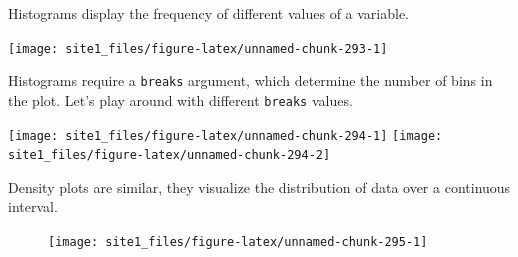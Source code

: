 \documentclass[]{book}
\newenvironment{Shaded}{\begin{snugshade}}{\end{snugshade}}
\newcommand{\KeywordTok}[1]{\textcolor[rgb]{0.13,0.29,0.53}{\textbf{#1}}}
\newcommand{\DataTypeTok}[1]{\textcolor[rgb]{0.13,0.29,0.53}{#1}}
\newcommand{\DecValTok}[1]{\textcolor[rgb]{0.00,0.00,0.81}{#1}}
\newcommand{\StringTok}[1]{\textcolor[rgb]{0.31,0.60,0.02}{#1}}
\newcommand{\CommentTok}[1]{\textcolor[rgb]{0.56,0.35,0.01}{\textit{#1}}}
\newcommand{\OperatorTok}[1]{\textcolor[rgb]{0.81,0.36,0.00}{\textbf{#1}}}
\newcommand{\AlertTok}[1]{\textcolor[rgb]{0.94,0.16,0.16}{#1}}
\newcommand{\NormalTok}[1]{#1}
\begin{document}
Histograms display the frequency of different values of a variable.

\begin{Shaded}
\end{Shaded}

\begin{center}\texttt{[image: site1\_files/figure-latex/unnamed-chunk-293-1]} \end{center}

Histograms require a \texttt{breaks} argument, which determine the
number of bins in the plot. Let's play around with different
\texttt{breaks} values.

\begin{Shaded}
\end{Shaded}

\begin{center}\texttt{[image: site1\_files/figure-latex/unnamed-chunk-294-1]} \texttt{[image: site1\_files/figure-latex/unnamed-chunk-294-2]} \end{center}

Density plots are similar, they visualize the distribution of data over
a continuous interval.

\begin{Shaded}
\end{Shaded}

\begin{figure}

{\centering \texttt{[image: site1\_files/figure-latex/unnamed-chunk-295-1]} 

}

\caption{ }\label{fig:unnamed-chunk-295}
\end{figure}
\end{document}

